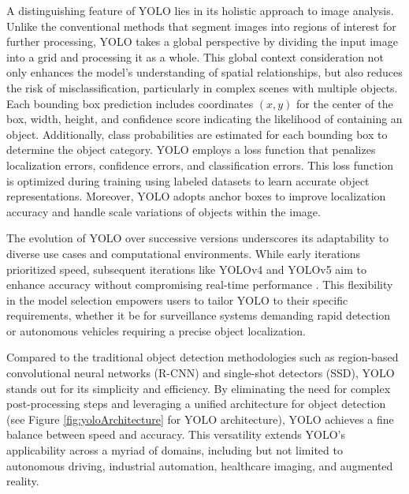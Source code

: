 A distinguishing feature of YOLO lies in its holistic approach to image analysis. Unlike the conventional methods that segment images into regions of interest for further processing, YOLO takes a global perspective by dividing the input image into a grid and processing it as a whole. This global context consideration not only enhances the model's understanding of spatial relationships, but also reduces the risk of misclassification, particularly in complex scenes with multiple objects. Each bounding box prediction includes coordinates $(x, y)$ for the center of the box, width, height, and confidence score indicating the likelihood of containing an object. Additionally, class probabilities are estimated for each bounding box to determine the object category. YOLO employs a loss function that penalizes localization errors, confidence errors, and classification errors.
This loss function is optimized during training using labeled datasets to learn accurate object representations. Moreover, YOLO adopts anchor boxes to improve localization accuracy and handle scale variations of objects within the image.

The evolution of YOLO over successive versions underscores its adaptability to diverse use cases and computational environments. While early iterations prioritized speed, subsequent iterations like YOLOv4 and YOLOv5 aim to enhance accuracy without compromising real-time performance \cite{YoloVersions2022}. This flexibility in the model selection empowers users to tailor YOLO to their specific requirements, whether it be for surveillance systems demanding rapid detection or autonomous vehicles requiring a precise object localization.

Compared to the traditional object detection methodologies such as region-based convolutional neural networks (R-CNN) \cite{MaskRCNN2017} and single-shot detectors (SSD), YOLO stands out for its simplicity and efficiency. By eliminating the need for complex post-processing steps and leveraging a unified architecture for object detection (see Figure \ref{fig:yoloArchitecture} for YOLO architecture), YOLO achieves a fine balance between speed and accuracy. This versatility extends YOLO's applicability across a myriad of domains, including but not limited to autonomous driving, industrial automation, healthcare imaging, and augmented reality.

